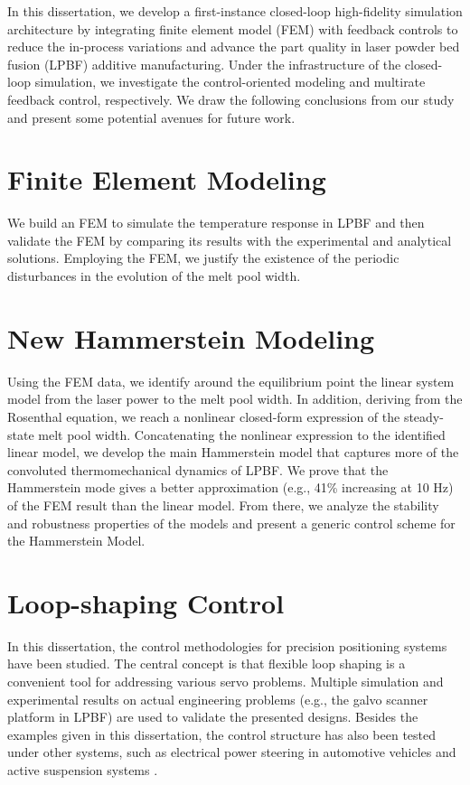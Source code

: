 \documentclass [11pt, proquest] {uwthesis}[2020/02/24]
\begin{document}
In this dissertation, we develop a first-instance closed-loop high-fidelity
simulation architecture by integrating finite element model (FEM)
with feedback controls to reduce the in-process variations and advance
the part quality in laser powder bed fusion (LPBF) additive manufacturing. Under the infrastructure of the closed-loop simulation, we investigate the control-oriented modeling and multirate feedback control, respectively. We draw the following conclusions from our study and present some potential avenues for future work.

\section*{Finite Element Modeling}

We build an FEM to simulate the temperature response in LPBF and then
validate the FEM by comparing its results with the experimental and
analytical solutions. Employing the FEM, we justify the existence
of the periodic disturbances in the evolution of the melt pool width.

\section*{New Hammerstein Modeling}

Using the FEM data, we identify around the equilibrium point the linear
system model from the laser power to the melt pool width. In addition,
deriving from the Rosenthal equation, we reach a nonlinear closed-form
expression of the steady-state melt pool width. Concatenating the
nonlinear expression to the identified linear model, we develop the
main Hammerstein model that captures more of the convoluted thermomechanical
dynamics of LPBF. We prove that the Hammerstein mode gives a better
approximation (e.g., 41\% increasing at 10 Hz) of the FEM result than
the linear model. From there, we analyze the stability and robustness
properties of the models and present a generic control scheme for
the Hammerstein Model.

\section*{Loop-shaping Control}

In this dissertation, the control methodologies for precision
positioning systems have been studied. The central concept is that
flexible loop shaping is a convenient tool for addressing various
servo problems. Multiple simulation and experimental results on actual
engineering problems (e.g., the galvo scanner platform in LPBF) are used to validate the presented designs. Besides
the examples given in this dissertation, the control structure has also
been tested under other systems, such as electrical power steering
in automotive vehicles \cite{chen2013inverse} and active suspension
systems \cite{chen2013selective,landau2005adaptive}. 
\end{document}
